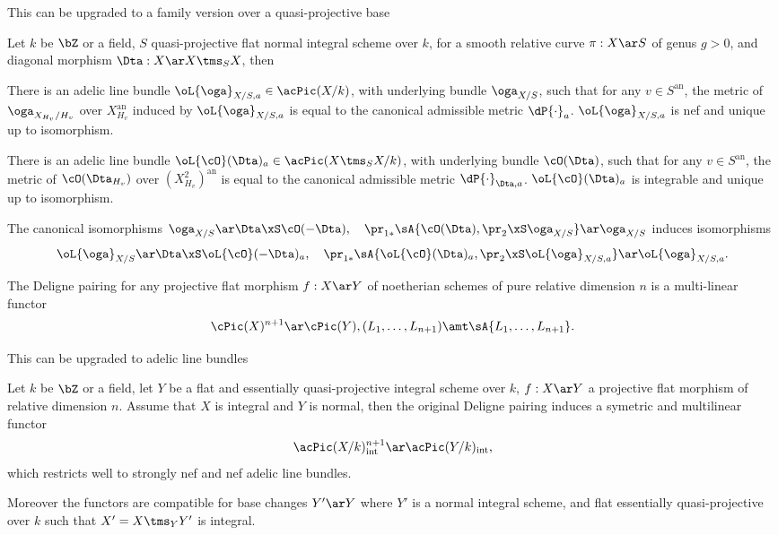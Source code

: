 \documentclass[a4paper, twoside]{article}
\begin{document}
This can be upgraded to a family version over a quasi-projective base
\begin{thm}
	Let $k$ be $\bZ$ or a field, $S$ quasi-projective flat normal integral scheme over $k$, for a smooth relative curve $\pi:X\ar S$ of genus $g>0$, and diagonal morphism $\Dta:X\ar X\tms_{S}X$, then
	\begin{enr}
		\item There is an adelic line bundle $\oL{\oga}_{X/S,a}\in\acPic(X/k)$, with underlying bundle $\oga_{X/S}$, such that for any $v\in S^{\mathrm{an}}$, the metric of $\oga_{X_{H_{v}}/H_{v}}$ over $X_{H_{v}}^{\mathrm{an}}$ induced by $\oL{\oga}_{X/S,a}$ is equal to the canonical admissible metric $\dP{\cdot}_{a}$. $\oL{\oga}_{X/S,a}$ is nef and unique up to isomorphism.
		\item There is an adelic line bundle $\oL{\cO}(\Dta)_{a}\in\acPic(X\tms_{S}X/k)$, with underlying bundle $\cO(\Dta)$, such that for any $v\in S^{\mathrm{an}}$, the metric of $\cO(\Dta_{H_{v}})$ over $(X_{H_{v}}^{2})^{\mathrm{an}}$ is equal to the canonical admissible metric $\dP{\cdot}_{\Dta,a}$. $\oL{\cO}(\Dta)_{a}$ is integrable and unique up to isomorphism.
		\item The canonical isomorphisms $\oga_{X/S}\ar\Dta\xS\cO(-\Dta),\quad \pr_{1*}\sA{\cO(\Dta),\pr_{2}\xS\oga_{X/S}}\ar\oga_{X/S}$ induces isomorphisms
		\[
			\oL{\oga}_{X/S}\ar\Dta\xS\oL{\cO}(-\Dta)_{a},\quad \pr_{1*}\sA{\oL{\cO}(\Dta)_{a},\pr_{2}\xS\oL{\oga}_{X/S,a}}\ar\oL{\oga}_{X/S,a}.
		\]
	\end{enr}
\end{thm}

The Deligne pairing for any projective flat morphism $f:X\ar Y$ of noetherian schemes of pure relative dimension $n$ is a multi-linear functor
\[
	\cPic(X)^{n+1}\ar\cPic(Y), (L_{1},\ldots,L_{n+1})\amt\sA{L_{1},\ldots,L_{n+1}}.
\]


This can be upgraded to adelic line bundles
\begin{thm}[{\cite[Theorem~4.1.2]{YZ2021}}]
	Let $k$ be $\bZ$ or a field, let $Y$ be a flat and essentially quasi-projective integral scheme over $k$, $f:X\ar Y$ a projective flat morphism of relative dimension $n$. Assume that $X$ is integral and $Y$ is normal, then the original Deligne pairing induces a symetric and multilinear functor
	\[
		\acPic(X/k)_{\mathrm{int}}^{n+1}\ar\acPic(Y/k)_{\mathrm{int}},
	\]
	which restricts well to strongly nef and nef adelic line bundles.

	Moreover the functors are compatible for base changes $Y'\ar Y$ where $Y'$ is a normal integral scheme, and flat essentially quasi-projective over $k$ such that $X'=X\tms_{Y}Y'$ is integral.
\end{thm}
\end{document}

